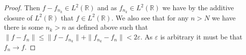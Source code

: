\documentclass{report}
\newcommand{\R}{\mathbb{R}}
\begin{document}
\begin{proof}
Then $f-f_{n_k} \in L^2 (\R )$ and as $f_{n_k}\in L^2 (\R )$ we have by the additive closure of $L^2 (\R )$ that $f \in L^2 (\R )$.
 We also see that
for any $n > N$ we have there is some $n_k>n$ as defined above such that
$\|f-f_n\|\leq\|f-f_{n_k}\|+\|f_{n_k}-f_{n}\|<2\varepsilon$. As $\varepsilon$ is arbitrary it must be that $f_n \to f$.
\end{proof}

\nocite{rudin}
\nocite{frazier}
\nocite{chui}
\nocite{tao}
{}

\end{document}
